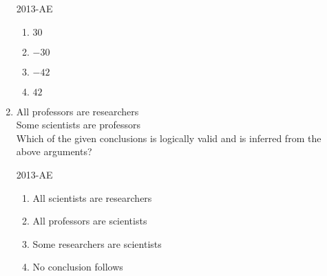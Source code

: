\documentclass[journal]{IEEEtran}
\begin{document}
\begin{enumerate}
\hfill{2013-AE}

\begin{enumerate}
    \item $30$
    \item $-30$
    \item $-42$
    \item $42$\\
\end{enumerate}

\item \label{Q.65}All professors are researchers\\
Some scientists are professors\\

Which of the given conclusions is logically valid and is inferred from the above arguments?

\hfill{2013-AE}

\begin{enumerate}
    \item All scientists are researchers
    \item All professors are scientists
    \item Some researchers are scientists
    \item No conclusion follows
\end{enumerate}

\end{enumerate}
\end{document}
